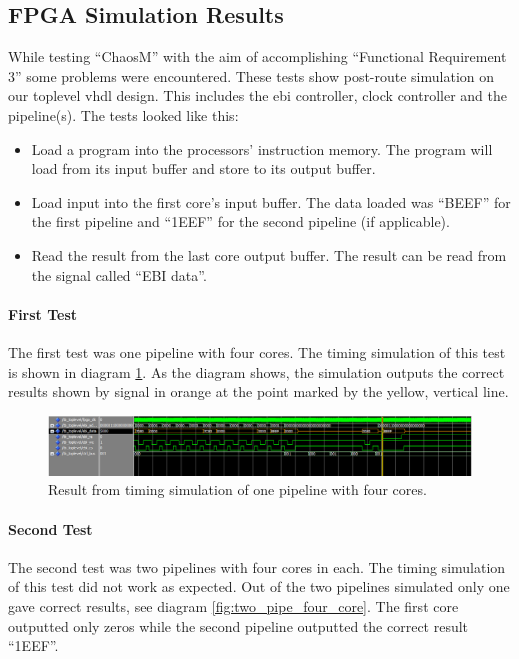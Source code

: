 
\subsection{FPGA Simulation Results}
While testing “ChaosM” with the aim of accomplishing “Functional Requirement 3” 
some problems were encountered. These tests show post-route simulation on our 
toplevel vhdl design. This includes the ebi controller, clock controller and the pipeline(s). 
The tests looked like this:

\begin{itemize}
\item Load a program into the processors’ instruction memory. The program will load from its input buffer and store to its output buffer.\\
\item Load input into the first core’s input buffer. The data loaded was “BEEF” for the first pipeline and “1EEF” for the second pipeline (if applicable).\\
\item Read the result from the last core output buffer. The result can be read from the signal called “EBI data”.\\
\end{itemize}


\paragraph{First Test}
The first test was one pipeline with four cores. The timing simulation of this test is
 shown in diagram \ref{fig:one_pipe_four_core}. As the diagram shows, 
 the simulation outputs the correct results shown by signal in orange at the point 
 marked by the yellow, vertical line. 
 
 \begin{figure}[H]
    \centering
    \includegraphics[width=1\textwidth]{figures/fpga/result_1_pipe_4_cores.png}
    \caption{Result from timing simulation of one pipeline with four cores.}
    \label{fig:one_pipe_four_core}
\end{figure}

\paragraph{Second Test}
The second test was two pipelines with four cores in each. The timing simulation 
of this test did not work as expected. Out of the two pipelines simulated only one 
gave correct results, see diagram \ref{fig:two_pipe_four_core}. The first core 
outputted only zeros while the second pipeline outputted the correct result “1EEF”. 

